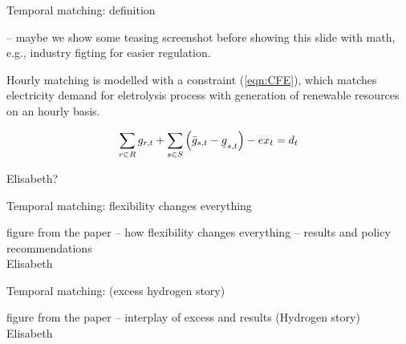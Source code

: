 \begin{frame}{Temporal matching: definition}

  -- maybe we show some teasing screenshot before showing this slide with math, e.g., industry figting for easier regulation.

  \alert{Hourly matching} is modelled with a constraint (\ref{eqn:CFE}), 
  which matches electricity demand for eletrolysis process with generation of renewable resources on an hourly basis. 

  \vspace{0.1cm}
  \begin{equation}
  \sum_{r\in R} g_{r,t} + \sum_{s\in S} \left(\bar{g}_{s,t} - \ubar{g}_{s,t}\right) - ex_t = d_t
  \label{eqn:CFE}
  \end{equation}
  \vspace{0.1cm}
  
  \noindent{}

  Elisabeth?

\end{frame}


\begin{frame}{Temporal matching: flexibility changes everything}

  figure from the paper -- how flexibility changes everything -- results and policy recommendations
   \\
  Elisabeth

\end{frame}


\begin{frame}{Temporal matching: (excess hydrogen story)}

  figure from the paper -- interplay of excess and results (Hydrogen story)
   \\
  Elisabeth

\end{frame}


